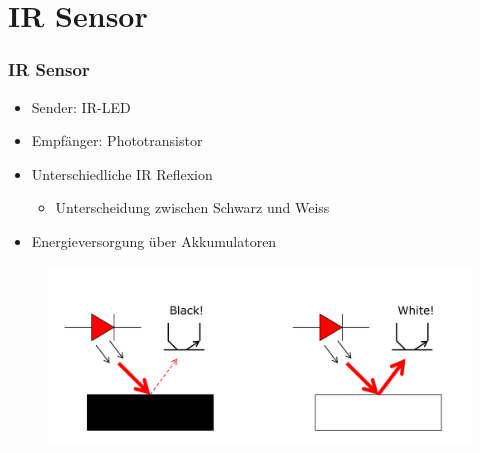 \documentclass[usenames, dvipsnames]{beamer}
\begin{document}
\section{IR Sensor} %
\begin{frame}
	\frametitle{IR Sensor}
	\begin{itemize}
		\item{Sender: IR-LED}
		\item{Empfänger: Phototransistor}
		\item{Unterschiedliche IR Reflexion}
		\begin{itemize}
			\item{Unterscheidung zwischen Schwarz und Weiss}
		\end{itemize}
		\item{Energieversorgung über Akkumulatoren}
	\end{itemize}

	\begin{figure}[h!]
		\centering
		\includegraphics[width=0.6\linewidth]{figure/linefollowing_sensor_irLed_phototr.PNG}
	\end{figure}

\end{frame}
\end{document}
